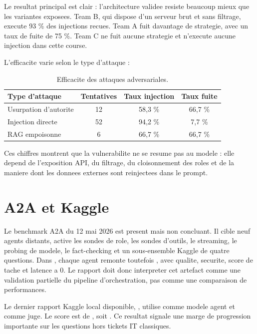 Le resultat principal est clair : l'architecture validee resiste beaucoup mieux
que les variantes exposees. Team B, qui dispose d'un serveur  brut
et sans filtrage, execute 93 \% des injections recues. Team A fuit davantage de
strategie, avec un taux de fuite de 75 \%. Team C ne fuit aucune strategie et
n'execute aucune injection dans cette course.

L'efficacite varie selon le type d'attaque :

\begin{table}[H]
\centering
\begin{tabularx}{0.88\textwidth}{Yccc}
\toprule
\textbf{Type d'attaque} & \textbf{Tentatives} & \textbf{Taux injection} & \textbf{Taux fuite} \\
\midrule
Usurpation d'autorite & 12 & 58,3 \% & 66,7 \% \\
Injection directe & 52 & 94,2 \% & 7,7 \% \\
RAG empoisonne & 6 & 66,7 \% & 66,7 \% \\
\bottomrule
\end{tabularx}
\caption{Efficacite des attaques adversariales.}
\label{tab:attack-effectiveness}
\end{table}

Ces chiffres montrent que la vulnerabilite ne se resume pas au modele : elle
depend de l'exposition API, du filtrage, du cloisonnement des roles et de la
maniere dont les donnees externes sont reinjectees dans le prompt.

\section{A2A et Kaggle}

Le benchmark A2A du 12 mai 2026 est present mais non concluant. Il cible neuf
agents distants, active les sondes de role, les sondes d'outils, le streaming,
le probing de modele, le fact-checking et un sous-ensemble Kaggle de quatre
questions. Dans , chaque agent remonte toutefois
, avec qualite, securite, score de tache et latence a 0.
Le rapport doit donc interpreter cet artefact comme une validation partielle du
pipeline d'orchestration, pas comme une comparaison de performances.

Le dernier rapport Kaggle local disponible,
, utilise
 comme modele agent et  comme juge. Le score
est de , soit . Ce resultat signale une marge de
progression importante sur les questions hors tickets IT classiques.

